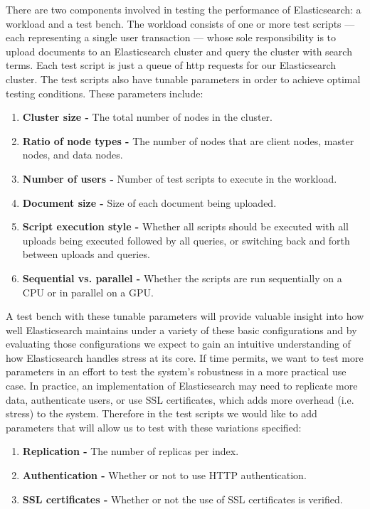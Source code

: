 \documentclass[journal]{IEEEtran}
\begin{document}
There are two components involved in testing the performance of Elasticsearch: a workload and a test bench. The workload consists of one or more test scripts — each representing a single user transaction — whose sole responsibility is to upload documents to an Elasticsearch cluster and query the cluster with search terms. Each test script is just a queue of http requests for our Elasticsearch cluster. The test scripts also have tunable parameters in order to achieve optimal testing conditions. These parameters include:
\begin{enumerate}
    \item \textbf{Cluster size -} The total number of nodes in the cluster.
    \item \textbf{Ratio of node types -} The number of nodes that are client nodes, master nodes, and data nodes.
    \item \textbf{Number of users -} Number of test scripts to execute in the workload.
    \item \textbf{Document size -} Size of each document being uploaded.
    \item \textbf{Script execution style -} Whether all scripts should be executed with all uploads being executed followed by all queries, or switching back and forth between uploads and queries.
    \item \textbf{Sequential vs. parallel -} Whether the scripts are run sequentially on a CPU or in parallel on a GPU.
\end{enumerate}

A test bench with these tunable parameters will provide valuable insight into how well Elasticsearch maintains under a variety of these basic configurations and by evaluating those configurations we expect to gain an intuitive understanding of how Elasticsearch handles stress at its core. If time permits, we want to test more parameters in an effort to test the system’s robustness in a more practical use case.  In practice, an implementation of Elasticsearch may need to replicate more data, authenticate users, or use SSL certificates, which adds more overhead (i.e. stress) to the system. Therefore in the test scripts we would like to add parameters that will allow us to test with these variations specified:

\begin{enumerate}
    \item \textbf{Replication -} The number of replicas per index.
    \item \textbf{Authentication -} Whether or not to use HTTP authentication.
    \item \textbf{SSL certificates -} Whether or not the use of SSL certificates is verified.
\end{enumerate}
\end{document}
